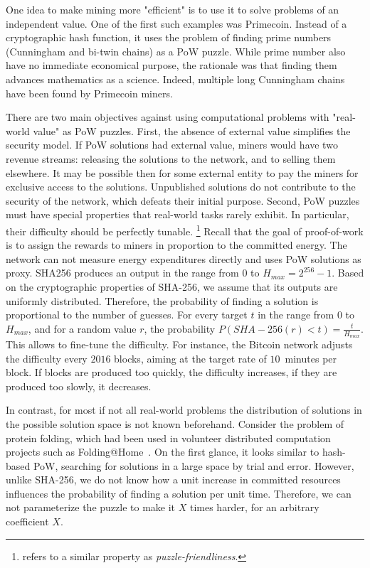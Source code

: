 One idea to make mining more "efficient" is to use it to solve problems of an independent value.
One of the first such examples was Primecoin.
Instead of a cryptographic hash function, it uses the problem of finding prime numbers (Cunningham and bi-twin chains) as a PoW puzzle.
While prime number also have no immediate economical purpose, the rationale was that finding them advances mathematics as a science.
Indeed, multiple long Cunningham chains have been found by Primecoin miners.

There are two main objectives against using computational problems with "real-world value" as PoW puzzles.
First, the absence of external value simplifies the security model.
If PoW solutions had external value, miners would have two revenue streams: releasing the solutions to the network, and to selling them elsewhere.
It may be possible then for some external entity to pay the miners for exclusive access to the solutions.
Unpublished solutions do not contribute to the security of the network, which defeats their initial purpose.
Second, PoW puzzles must have special properties that real-world tasks rarely exhibit.
In particular, their difficulty should be perfectly tunable.
\footnote{\cite{Narayanan2016} refers to a similar property as \textit{puzzle-friendliness}.}
Recall that the goal of proof-of-work is to assign the rewards to miners in proportion to the committed energy.
The network can not measure energy expenditures directly and uses PoW solutions as proxy.
SHA256 produces an output in the range from $0$ to $H_{max} = 2^{256}-1$.
Based on the cryptographic properties of SHA-256, we assume that its outputs are uniformly distributed.
Therefore, the probability of finding a solution is proportional to the number of guesses.
For every target $t$ in the range from $0$ to $H_{max}$, and for a random value $r$, the probability $P(SHA-256(r) < t) = \frac{t}{H_{max}}$.
This allows to fine-tune the difficulty.
For instance, the Bitcoin network adjusts the difficulty every $2016$ blocks, aiming at the target rate of $10$~minutes per block.
If blocks are produced too quickly, the difficulty increases, if they are produced too slowly, it decreases.

In contrast, for most if not all real-world problems the distribution of solutions in the possible solution space is not known beforehand.
Consider the problem of protein folding, which had been used in volunteer distributed computation projects such as Folding@Home~\cite{Beberg2009}.
On the first glance, it looks similar to hash-based PoW, searching for solutions in a large space by trial and error.
However, unlike SHA-256, we do not know how a unit increase in committed resources influences the probability of finding a solution per unit time.
Therefore, we can not parameterize the puzzle to make it $X$ times harder, for an arbitrary coefficient $X$.


